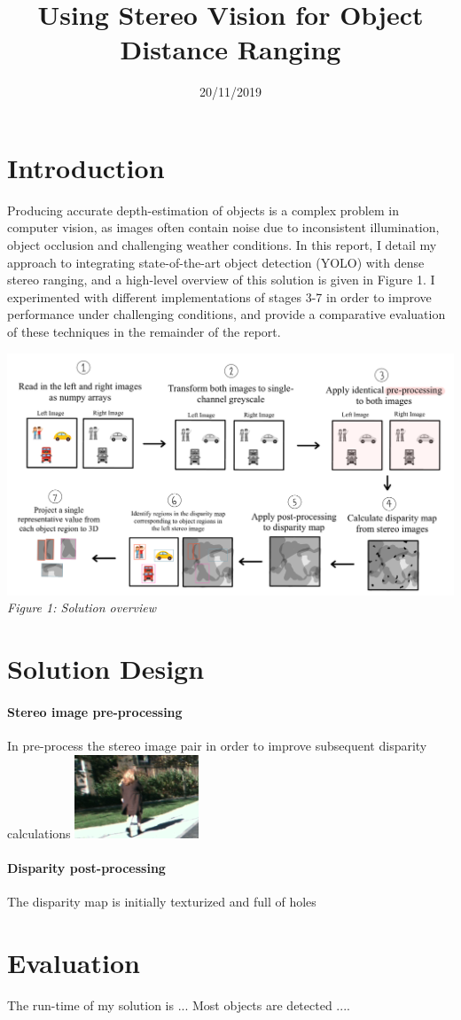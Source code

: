 \documentclass[12pt,a4paper]{article}
\title{Using Stereo Vision for Object Distance Ranging}
\author{} %
\date{20/11/2019}
\begin{document}
\maketitle

\vspace{3 mm}
\section{Introduction}
\noindent Producing accurate depth-estimation of objects is a complex problem in computer vision, as images often contain noise due to inconsistent illumination, object occlusion and challenging weather conditions. In this report, I detail my approach to integrating state-of-the-art object detection (YOLO) with dense stereo ranging, and a high-level overview of this solution is given in Figure 1.  I experimented with different implementations of stages 3-7 in order to improve performance under challenging conditions, and provide a comparative evaluation of these techniques in the remainder of the report.


\begin{center}
	\includegraphics[scale=0.25]{Solutiondiagram}
	\textit{Figure 1: Solution overview}
\end{center}


\newpage



\section{Solution Design}
\paragraph{Stereo image pre-processing}
In pre-process the stereo image pair in order to improve subsequent disparity calculations
\includegraphics[scale=2]{no_filter}


\paragraph{Disparity post-processing}
The disparity map is initially texturized and full of holes


\section{Evaluation}
The run-time of my solution is ...
Most objects are detected ....


\end{document}
